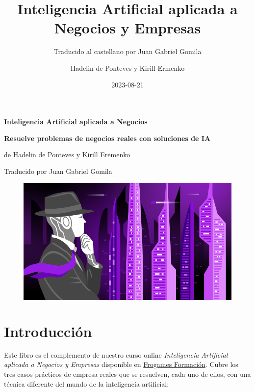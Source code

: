 \documentclass[
]{book}
\title{Inteligencia Artificial aplicada a Negocios y Empresas}
\subtitle{Traducido al castellano por Juan Gabriel Gomila}
\author{Hadelin de Ponteves y Kirill Ermenko}
\date{2023-08-21}
\begin{document}
\maketitle


\begin{titlepage}

\begin{center}

\Huge \textbf{Inteligencia Artificial aplicada a Negocios}

\Large \textbf{Resuelve problemas de negocios reales con soluciones de IA}

\large de Hadelin de Ponteves y Kirill Eremenko

\large Traducido por Juan Gabriel Gomila


\end{center}

\begin{figure}[!htbp]
		\begin{center}
			\includegraphics{Images/Course_Image.png}
		\end{center}
\end{figure}

\end{titlepage}

{
\setcounter{tocdepth}{1}
\tableofcontents
}
\hypertarget{introducciuxf3n}{%
\chapter*{Introducción}\label{introducciuxf3n}}

Este libro es el complemento de nuestro curso online \emph{Inteligencia Artificial aplicada a Negocios y Empresas} disponible en \href{https://cursos.frogamesformacion.com/courses/ia-aplicada-negocios?coupon=frogames30}{Frogames Formación}. Cubre los tres casos prácticos de empresa reales que se resuelven, cada uno de ellos, con una técnica diferente del mundo de la inteligencia artificial:
\end{document}
